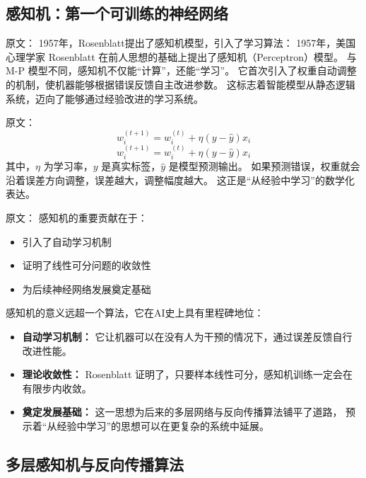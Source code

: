 \subsection{感知机：第一个可训练的神经网络}

原文：
1957年，Rosenblatt提出了感知机模型，引入了学习算法：
1957年，美国心理学家 Rosenblatt 在前人思想的基础上提出了感知机（Perceptron）模型。  
与 M-P 模型不同，感知机不仅能“计算”，还能“学习”。  
它首次引入了权重自动调整的机制，使机器能够根据错误反馈自主改进参数。  
这标志着智能模型从静态逻辑系统，迈向了能够通过经验改进的学习系统。

原文：
\begin{equation}
w_{i}^{(t+1)} = w_{i}^{(t)} + \eta (y - \hat{y}) x_i
\end{equation}
\begin{equation}
w_{i}^{(t+1)} = w_{i}^{(t)} + \eta (y - \hat{y}) x_i
\end{equation}
其中，$\eta$ 为学习率，$y$ 是真实标签，$\hat{y}$ 是模型预测输出。  
如果预测错误，权重就会沿着误差方向调整，误差越大，调整幅度越大。  
这正是“从经验中学习”的数学化表达。

原文：
感知机的重要贡献在于：
\begin{itemize}
\item 引入了自动学习机制
\item 证明了线性可分问题的收敛性
\item 为后续神经网络发展奠定基础
\end{itemize}
感知机的意义远超一个算法，它在AI史上具有里程碑地位：
\begin{itemize}
\item {\bf 自动学习机制：} 它让机器可以在没有人为干预的情况下，通过误差反馈自行改进性能。
\item {\bf 理论收敛性：} Rosenblatt 证明了，只要样本线性可分，感知机训练一定会在有限步内收敛。
\item {\bf 奠定发展基础：} 这一思想为后来的多层网络与反向传播算法铺平了道路，  
预示着“从经验中学习”的思想可以在更复杂的系统中延展。
\end{itemize}


\subsection{多层感知机与反向传播算法}

